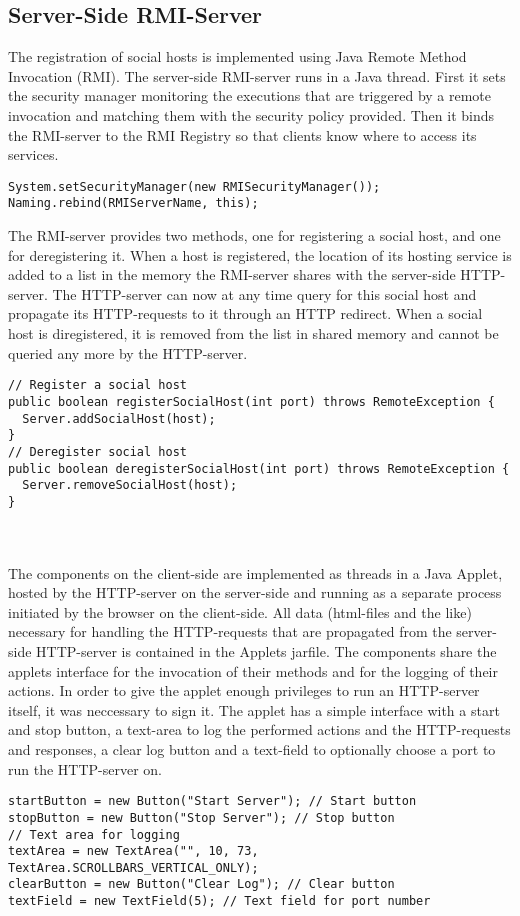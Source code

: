 \documentclass[a4paper, 10pt]{article}
\begin{document}
\subsection{Server-Side RMI-Server}
The registration of social hosts is implemented using Java Remote Method Invocation (RMI). The server-side RMI-server runs in a Java thread. First it sets the security manager monitoring the executions that are triggered by a remote invocation and matching them with the security policy provided. Then it binds the RMI-server to the RMI Registry so that clients know where to access its services.
\begin{lstlisting}
System.setSecurityManager(new RMISecurityManager());
Naming.rebind(RMIServerName, this);
\end{lstlisting}
The RMI-server provides two methods, one for registering a social host, and one for deregistering it. When a host is registered, the location of its hosting service is added to a list in the memory the RMI-server shares with the server-side HTTP-server. The HTTP-server can now at any time query for this social host and propagate its HTTP-requests to it through an HTTP redirect. When a social host is diregistered, it is removed from the list in shared memory and cannot be queried any more by the HTTP-server.
\begin{lstlisting}
// Register a social host
public boolean registerSocialHost(int port) throws RemoteException {
  Server.addSocialHost(host);
}
// Deregister social host
public boolean deregisterSocialHost(int port) throws RemoteException {
  Server.removeSocialHost(host);
}
\end{lstlisting}
~\\
\\
The components on the client-side are implemented as threads in a Java Applet, hosted by the HTTP-server on the server-side and running as a separate process initiated by the browser on the client-side. All data (html-files and the like) necessary for handling the HTTP-requests that are propagated from the server-side HTTP-server is contained in the Applets jarfile. The components share the applets interface for the invocation of their methods and for the logging of their actions. In order to give the applet enough privileges to run an HTTP-server itself, it was neccessary to sign it. The applet has a simple interface with a start and stop button, a text-area to log the performed actions and the HTTP-requests and responses, a clear log button and a text-field to optionally choose a port to run the HTTP-server on. 
\begin{lstlisting}
startButton = new Button("Start Server"); // Start button
stopButton = new Button("Stop Server"); // Stop button
// Text area for logging
textArea = new TextArea("", 10, 73, TextArea.SCROLLBARS_VERTICAL_ONLY); 
clearButton = new Button("Clear Log"); // Clear button
textField = new TextField(5); // Text field for port number
\end{lstlisting}
\end{document}
